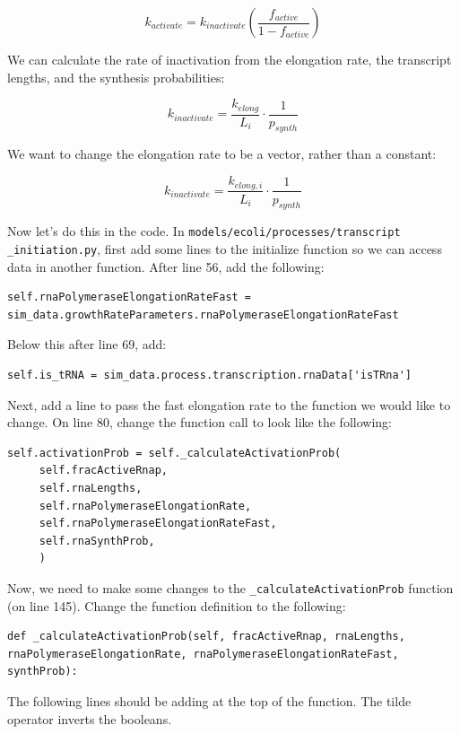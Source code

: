 \documentclass[12pt]{article}
\begin{document}
$$
k_{activate}=k_{inactivate}\left(\frac{f_{active}}{1-f_{active}} \right)
$$

We can calculate the rate of inactivation from the elongation rate, the transcript lengths, and the synthesis probabilities:

$$
k_{inactivate}=\frac{k_{elong}}{L_i}\cdot\frac{1}{p_{synth}}
$$

We want to change the elongation rate to be a vector, rather than a constant:

$$
k_{inactivate}=\frac{k_{elong,i}}{L_i}\cdot \frac{1}{p_{synth}}
$$

Now let's do this in the code. In \texttt{models/ecoli/processes/transcript \allowbreak \_initiation.py}, first add some lines to the initialize function so we can access data in another function.  After line 56, add the following:

\begin{lstlisting}
self.rnaPolymeraseElongationRateFast = sim_data.growthRateParameters.rnaPolymeraseElongationRateFast
\end{lstlisting}

Below this after line 69, add:

\begin{lstlisting}
self.is_tRNA = sim_data.process.transcription.rnaData['isTRna']
\end{lstlisting}

Next, add a line to pass the fast elongation rate to the function we would like to change.  On line 80, change the function call to look like the following:

\begin{lstlisting}
self.activationProb = self._calculateActivationProb(
	 self.fracActiveRnap,
	 self.rnaLengths,
	 self.rnaPolymeraseElongationRate,
	 self.rnaPolymeraseElongationRateFast,
	 self.rnaSynthProb,
	 )
\end{lstlisting}

Now, we need to make some changes to the \texttt{\_calculateActivationProb} function (on line 145). Change the function definition to the following:

\begin{lstlisting}
def _calculateActivationProb(self, fracActiveRnap, rnaLengths, rnaPolymeraseElongationRate, rnaPolymeraseElongationRateFast, synthProb):
\end{lstlisting}

The following lines should be adding at the top of the function. The tilde operator inverts the booleans.
\end{document}
